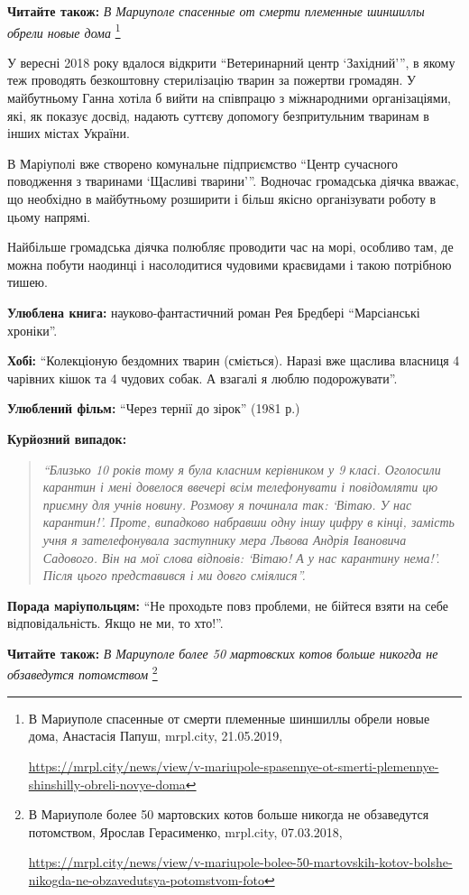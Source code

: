 \textbf{Читайте також:} \emph{В Мариуполе спасенные от смерти племенные шиншиллы обрели новые дома}%
\footnote{В Мариуполе спасенные от смерти племенные шиншиллы обрели новые дома, Анастасія Папуш, mrpl.city, 21.05.2019, \par%
\url{https://mrpl.city/news/view/v-mariupole-spasennye-ot-smerti-plemennye-shinshilly-obreli-novye-doma}%
}


У вересні 2018 року вдалося відкрити \enquote{Ветеринарний центр \enquote{Західний}}, в якому
теж проводять безкоштовну стерилізацію тварин за пожертви громадян. У
майбутньому Ганна хотіла б вийти на співпрацю з міжнародними організаціями,
які, як показує досвід, надають суттєву допомогу безпритульним тваринам в інших
містах України.

В Маріуполі вже створено комунальне підприємство \enquote{Центр сучасного поводження з
тваринами \enquote{Щасливі тварини}}. Водночас громадська діячка вважає, що необхідно в
майбутньому розширити і більш якісно організувати роботу в цьому напрямі.

Найбільше громадська діячка полюбляє проводити час на морі, особливо там, де
можна побути наодинці і насолодитися чудовими краєвидами і такою потрібною
тишею.


\textbf{Улюблена книга:} науково-фантастичний роман Рея Бредбері \enquote{Марсіанські хроніки}.

\textbf{Хобі:} \enquote{Колекціоную бездомних тварин (сміється). Наразі вже щаслива власниця 4 чарівних кішок та 4 чудових собак. А взагалі я люблю подорожувати}.

\textbf{Улюблений фільм:} \enquote{Через тернії до зірок} (1981 р.)


\textbf{Курйозний випадок:} 

\begin{quote}
\em\enquote{Близько 10 років тому я була класним керівником у 9 класі. Оголосили карантин
і мені довелося ввечері всім телефонувати і повідомляти цю приємну для учнів
новину. Розмову я починала так: \enquote{Вітаю. У нас карантин!}. Проте, випадково
набравши одну іншу цифру в кінці, замість учня я зателефонувала заступнику мера
Львова Андрія Івановича Садового. Він на мої слова відповів: \enquote{Вітаю! А у нас
карантину нема!}. Після цього представився і ми довго сміялися}.
\end{quote}

\textbf{Порада маріупольцям:} \enquote{Не проходьте повз проблеми, не бійтеся взяти на себе відповідальність. Якщо не ми, то хто!}.

\textbf{Читайте також:} \emph{В Мариуполе более 50 мартовских котов больше никогда не обзаведутся потомством}%
\footnote{В Мариуполе более 50 мартовских котов больше никогда не обзаведутся потомством, Ярослав Герасименко, mrpl.city, 07.03.2018, \par%
\url{https://mrpl.city/news/view/v-mariupole-bolee-50-martovskih-kotov-bolshe-nikogda-ne-obzavedutsya-potomstvom-foto}}

